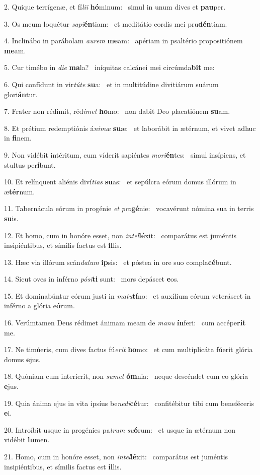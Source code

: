 2. Quique terrígenæ, et fí\textit{li}\textit{i} \textbf{hó}minum: \ast\  simul in unum dives et \textbf{pau}per.\

3. Os meum loquétur \textit{sa}\textit{pi}\textbf{én}tiam: \ast\  et meditátio cordis mei pru\textbf{dén}tiam.\

4. Inclinábo in parábolam \textit{au}\textit{rem} \textbf{me}am: \ast\  apériam in psaltério propositiónem \textbf{me}am.\

5. Cur timébo in \textit{di}\textit{e} \textbf{ma}la? \ast\  iníquitas calcánei mei circúmda\textbf{bit} me:\

6. Qui confídunt in vir\textit{tú}\textit{te} \textbf{su}a: \ast\  et in multitúdine divitiárum suárum glori\textbf{án}tur.\

7. Frater non rédimit, réd\textit{i}\textit{met} \textbf{ho}mo: \ast\  non dabit Deo placatiónem \textbf{su}am.\

8. Et prétium redemptiónis á\textit{ni}\textit{mæ} \textbf{su}æ: \ast\  et laborábit in ætérnum, et vivet adhuc in \textbf{fi}nem.\

9. Non vidébit intéritum, cum víderit sapiéntes \textit{mo}\textit{ri}\textbf{én}tes: \ast\  simul insípiens, et stultus per\textbf{í}bunt.\

10. Et relínquent aliénis diví\textit{ti}\textit{as} \textbf{su}as: \ast\  et sepúlcra eórum domus illórum in æ\textbf{tér}num.\

11. Tabernácula eórum in progénie \textit{et} \textit{pro}\textbf{gé}nie: \ast\  vocavérunt nómina sua in terris \textbf{su}is.\

12. Et homo, cum in honóre esset, non \textit{in}\textit{tel}\textbf{lé}xit: \ast\  comparátus est juméntis insipiéntibus, et símilis factus est \textbf{il}lis.\

13. Hæc via illórum scán\textit{da}\textit{lum} \textbf{ip}sis: \ast\  et póstea in ore suo compla\textbf{cé}bunt.\

14. Sicut oves in inférno \textit{pó}\textit{si}\textbf{ti} sunt: \ast\  mors depáscet \textbf{e}os.\

15. Et dominabúntur eórum justi in \textit{ma}\textit{tu}\textbf{tí}no: \ast\  et auxílium eórum veteráscet in inférno a glória e\textbf{ó}rum.\

16. Verúmtamen Deus rédimet ánimam meam de \textit{ma}\textit{nu} \textbf{ín}feri: \ast\  cum accépe\textbf{rit} me.\

17. Ne timúeris, cum dives factus fú\textit{e}\textit{rit} \textbf{ho}mo: \ast\  et cum multiplicáta fúerit glória domus \textbf{e}jus.\

18. Quóniam cum interíerit, non \textit{su}\textit{met} \textbf{óm}nia: \ast\  neque descéndet cum eo glória \textbf{e}jus.\

19. Quia ánima ejus in vita ipsíus be\textit{ne}\textit{di}\textbf{cé}tur: \ast\  confitébitur tibi cum beneféceris \textbf{e}i.\

20. Introíbit usque in progénies pa\textit{trum} \textit{su}\textbf{ó}rum: \ast\  et usque in ætérnum non vidébit \textbf{lu}men.\

21. Homo, cum in honóre esset, non \textit{in}\textit{tel}\textbf{lé}xit: \ast\  comparátus est juméntis insipiéntibus, et símilis factus est \textbf{il}lis.\

